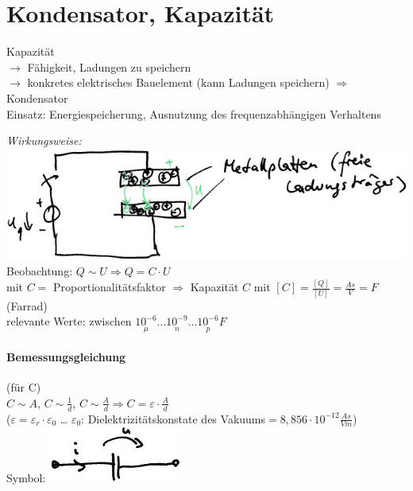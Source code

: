 \section{Kondensator, Kapazität}

Kapazität \\
$\rightarrow$ Fähigkeit, Ladungen zu speichern\\
$\rightarrow$ konkretes elektrisches Bauelement (kann Ladungen speichern) $\Rightarrow$ Kondensator \medskip\\
Einsatz: Energiespeicherung, Ausnutzung des frequenzabhängigen Verhaltens

\emph{Wirkungsweise:}\\
\includegraphics[scale=1.5]{Abbildungen/ABB406}\\
Beobachtung: $Q\sim U \Rightarrow Q=C\cdot U$ \\
mit $C = $ Proportionalitätsfaktor $\Rightarrow$ Kapazität $C$ mit $[C]=\frac{[Q]}{[U]}=\frac{As}{V}=F$ (Farrad)\\
relevante Werte: zwischen $\underset{\mu}{10^{-6}}... \underset{n}{10^{-9}}...\underset{p}{10^{-6}}F$
\paragraph{Bemessungsgleichung} (für C)\\
$C \sim A$, $C\sim \frac{1}{d}$, $C\sim  \frac{A}{d} \Rightarrow C=\varepsilon \cdot \frac{A}{d}$ \\
($\varepsilon = \varepsilon_r \cdot \varepsilon_0$ … $\varepsilon_0$: Dielektrizitätskonstate des Vakuums$=8,856\cdot 10^{-12}\frac{As}{Vm}$)\\
Symbol: \includegraphics[scale=1.5]{Abbildungen/ABB407}
